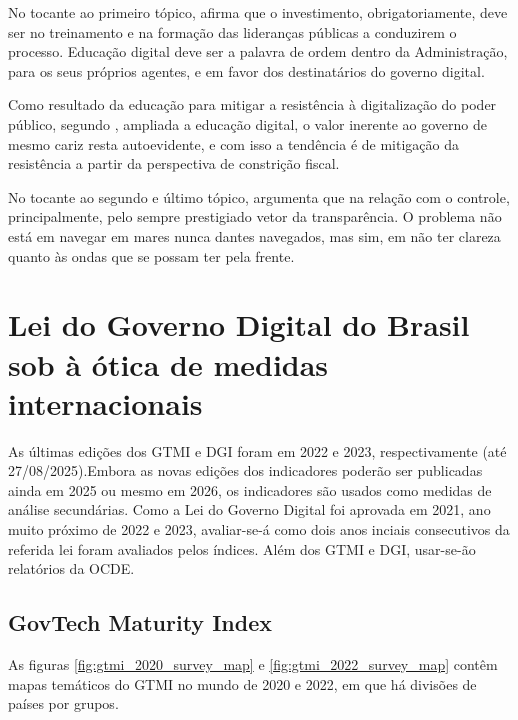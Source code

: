 No tocante ao primeiro tópico, \cite{do2022governo} afirma que o investimento, obrigatoriamente, deve ser no treinamento e na formação das lideranças públicas 
a conduzirem o processo. Educação digital deve ser a palavra de ordem dentro da Administração, para os seus próprios agentes, e em favor dos destinatários do governo digital. 

Como resultado da educação para mitigar a resistência à digitalização do poder público, segundo \cite{do2022governo}, ampliada a educação digital, o valor inerente ao governo de mesmo cariz resta autoevidente, e com isso a tendência é de mitigação da resistência a partir da perspectiva de constrição fiscal.

No tocante ao segundo e último tópico, \cite{do2022governo} argumenta que na relação com o controle, principalmente, pelo sempre prestigiado vetor da transparência. O problema não está em navegar em mares nunca dantes navegados, mas sim, em não ter clareza quanto às ondas que se possam ter pela frente.

\section{Lei do Governo Digital do Brasil sob à ótica de medidas internacionais}

As últimas edições dos GTMI e DGI foram em 2022 e 2023, respectivamente (até 27/08/2025).Embora as novas edições dos indicadores poderão ser publicadas ainda em 2025 ou mesmo em 2026, os indicadores são usados como medidas de análise secundárias. Como a Lei do Governo Digital foi aprovada em 2021, ano muito próximo de 2022 e 2023, avaliar-se-á como dois anos inciais consecutivos da referida lei foram avaliados pelos índices. Além dos GTMI e DGI, usar-se-ão relatórios da OCDE.

\subsection{GovTech Maturity Index}

As figuras \ref{fig:gtmi_2020_survey_map} e \ref{fig:gtmi_2022_survey_map} contêm mapas temáticos do GTMI no mundo de 2020 e 2022, em que há divisões de países por grupos.

